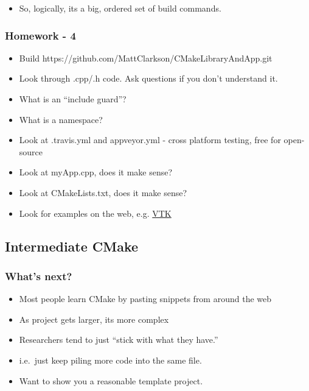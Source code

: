 \begin{itemize}
\itemsep1pt\parskip0pt
\item
  So, logically, its a big, ordered set of build commands.
\end{itemize}

\subsubsection{Homework - 4}\label{homework---4}

\begin{itemize}
\itemsep1pt\parskip0pt
\item
  Build https://github.com/MattClarkson/CMakeLibraryAndApp.git
\item
  Look through .cpp/.h code. Ask questions if you don't understand it.
\item
  What is an ``include guard''?
\item
  What is a namespace?
\item
  Look at .travis.yml and appveyor.yml - cross platform testing, free
  for open-source
\item
  Look at myApp.cpp, does it make sense?
\item
  Look at CMakeLists.txt, does it make sense?
\item
  Look for examples on the web, e.g.
  \href{https://lorensen.github.io/VTKExamples/site/Cxx/GeometricObjects/Cone/}{VTK}
\end{itemize}

\subsection{Intermediate CMake}\label{intermediate-cmake}

\subsubsection{What's next?}\label{whats-next}

\begin{itemize}
\itemsep1pt\parskip0pt
\item
  Most people learn CMake by pasting snippets from around the web
\item
  As project gets larger, its more complex
\item
  Researchers tend to just ``stick with what they have.''
\item
  i.e.~just keep piling more code into the same file.
\item
  Want to show you a reasonable template project.
\end{itemize}

